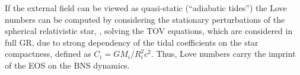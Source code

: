 %
%
If the external field can be viewed as quasi-static (``adiabatic tides'') the 
Love numbers can be computed by considering the stationary perturbations of the spherical 
relativistic star, \ie, solving the \ac{TOV} equations, which are considered in full \ac{GR}, 
due to strong dependency of the tidal coefficients on the star compactness, defined as 
$C_{i} = GM_i/R_i^2c^2$. 
%
Thus, Love numbers carry the imprint of the \ac{EOS} on the \ac{BNS} dynamics.
%
%

